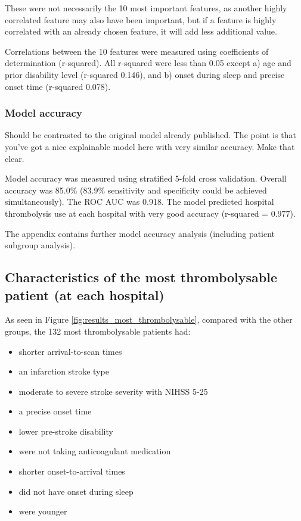 These were not necessarily the 10 most important features, as another highly correlated feature may also have been important, but if a feature is highly correlated with an already chosen feature, it will add less additional value.

Correlations between the 10 features were measured using coefficients of determination (r-squared). All r-squared were less than 0.05 except a) age and prior disability level (r-squared 0.146), and b) onset during sleep and precise onset time (r-squared 0.078).


\subsubsection{Model accuracy}

Should be contrasted to the original model already published.  The point is that you've got a nice explainable model here with very similar accuracy.  Make that clear.

Model accuracy was measured using stratified 5-fold cross validation. Overall accuracy was 85.0\% (83.9\% sensitivity and specificity could be achieved simultaneously). The ROC AUC was 0.918. The model predicted hospital thrombolysis use at each hospital with very good accuracy (r-squared = 0.977).

The appendix contains further model accuracy analysis (including patient subgroup analysis).


\subsection{Characteristics of the most thrombolysable patient (at each hospital)}

As seen in Figure \ref{fig:results_most_thrombolysable}, compared with the other groups, the 132 most thrombolysable patients had:
\begin{itemize}
    \item shorter arrival-to-scan times
    \item an infarction stroke type
    \item moderate to severe stroke severity with NIHSS 5-25
    \item a precise onset time
    \item lower pre-stroke disability
    \item were not taking anticoagulant medication
    \item shorter onset-to-arrival times
    \item did not have onset during sleep
    \item were younger
\end{itemize}


